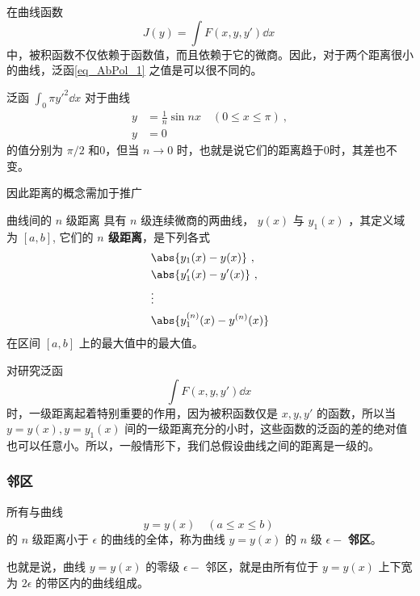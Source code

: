 在曲线函数
\begin{equation}\label{eq_AbPol_1}
J(y)=\int F(x,y,y')\dd x~
\end{equation}
中，被积函数不仅依赖于函数值，而且依赖于它的微商。因此，对于两个距离很小的曲线，泛函\autoref{eq_AbPol_1} 之值是可以很不同的。
\begin{example}{}
泛函 $\int_0\pi y'^2\dd x$ 对于曲线
\begin{equation}
\begin{aligned}
y&=\frac{1}{n}\sin nx\quad (0\leq x\leq \pi)~,\\
y&=0
\end{aligned}
\end{equation}
的值分别为 $\pi/2$ 和0，但当 $n\rightarrow 0$ 时，也就是说它们的距离趋于0时，其差也不变。
\end{example}

因此距离的概念需加于推广
\begin{definition}{曲线间的 $n$ 级距离}\label{def_AbPol_1}
具有 $n$ 级连续微商的两曲线， $y(x)$ 与 $y_1(x)$ ，其定义域为 $[a,b]$, 它们的 \textbf{$n$ 级距离}，是下列各式
\begin{equation}
\begin{aligned}
&\abs{y_1(x)-y(x)}~,\\
&\abs{y_1'(x)-y'(x)}~,\\
&\vdots\\
&\abs{y_1^{(n)}(x)-y^{(n)}(x)}\\
\end{aligned}
\end{equation}
在区间 $[a,b]$ 上的最大值中的最大值。
\end{definition}

对研究泛函
\begin{equation}
\int F(x,y,y')\dd x~
\end{equation}
时，一级距离起着特别重要的作用，因为被积函数仅是 $x,y,y'$ 的函数，所以当 $y=y(x),y=y_1(x)$ 间的一级距离充分的小时，这些函数的泛函的差的绝对值也可以任意小。所以，一般情形下，我们总假设曲线之间的距离是一级的。
\subsubsection{邻区}
所有与曲线
\begin{equation}
y=y(x)\quad (a\leq x\leq b)~
\end{equation}
 的 $n$ 级距离小于 $\epsilon$ 的曲线的全体，称为曲线 $y=y(x)$ 的 $n$ 级 $\epsilon -$ \textbf{邻区}。 
 
 也就是说，曲线 $y=y(x)$ 的零级 $\epsilon-$ 邻区，就是由所有位于 $y=y(x)$ 上下宽为 $2\epsilon$ 的带区内的曲线组成。

